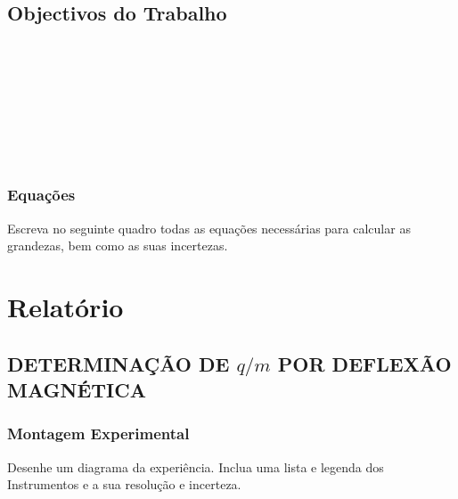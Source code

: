 \documentclass[a4paper,12pt]{article}  %
\begin{document}
\subsection{\sf Objectivos do Trabalho}
\noindent\underline{\makebox[\textwidth][r]{~}} \\
\noindent\underline{\makebox[\textwidth][r]{~}} \\
\noindent\underline{\makebox[\textwidth][r]{~}} \\
\noindent\underline{\makebox[\textwidth][r]{~}} \\
\noindent\underline{\makebox[\textwidth][r]{~}} \\
\noindent\underline{\makebox[\textwidth][r]{~}} \\
\noindent\underline{\makebox[\textwidth][r]{~}} \\

\subsubsection{\sf Equações }
Escreva no seguinte quadro todas as equações necessárias para calcular as grandezas, bem como as suas incertezas.
\begin{center}
\framebox[13cm]{\rule{0pt}{6.5cm}}
\end{center}


\section{\sf Relatório}
\subsection{\sf DETERMINAÇÃO DE $q/m$ POR  DEFLEXÃO MAGNÉTICA}
\subsubsection{\sf Montagem Experimental}
Desenhe um diagrama da experiência. Inclua uma lista e legenda dos Instrumentos e a sua resolução e incerteza.
\begin{center}
\framebox[18cm]{\rule{0pt}{6.5cm}}
\end{center}




\end{document}
